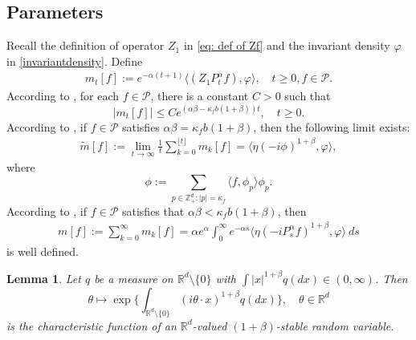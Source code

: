 \documentclass[12pt,a4paper]{amsart}
\theoremstyle{plain}
\newtheorem{lem}[thm]{Lemma}
\theoremstyle{definition}
\numberwithin{equation}{section}
\begin{document}
\subsection{Parameters}
    Recall the definition of operator $Z_1$ in \eqref{eq: def of Zf} and the invariant density $\varphi$ in \eqref{invariantdensity}.
    Define
 \begin{equation}\begin{split}
 \label{parameter_mk}
      m_t[f]
      :=e^{-\alpha (t+1)} \langle (Z_1P^\alpha_t f), \varphi\rangle,\quad t\geq 0, f\in \mathcal P.
 \end{split}\end{equation}
    According to \cite[Lemma 2.7]{MM}, for each $f\in\mathcal{P}$, there is a constant $C>0$ such that
\[
    |m_t[f]|
    \leq C e^{(\alpha\beta-\kappa_fb(1+\beta))t},
    \quad t\geq 0.
\]
    According to \cite[Lemma 4.2]{MM}, if $f \in \mathcal{P}$ satisfies $\alpha\beta=\kappa_f b(1+\beta)$, then the following limit exists:
\begin{equation}\begin{split}
\label{para: critical case}
    \tilde{m}[f]:=\lim_{t\rightarrow \infty}\frac{1}{t}\sum_{k=0}^{\lfloor t \rfloor}m_k[f]=\langle\eta(-i\phi)^{1+\beta},\varphi\rangle,
\end{split}\end{equation}
    where
\[
    \phi
    :=\sum_{p\in \mathbb Z_+^d:|p|=\kappa_f}\langle f, \phi_p\rangle\phi_p.
\]
    According to \cite[Lemma 5.1]{MM}, if $f\in \mathcal{P}$ satisfies that $\alpha\beta<\kappa_fb(1+\beta)$, then
\begin{equation}\begin{split}
    m[f]
    :=\sum_{k=0}^\infty m_k[f]
    =\alpha e^{\alpha}\int_0^{\infty} e^{-\alpha s} \langle \eta (-iP_s^\alpha f)^{1+\beta}, \varphi \rangle~ds \label{msmallcase}
\end{split}\end{equation}
is well defined.
\begin{lem}
\label{lem: charactreisticfunction}
    Let $q$ be a measure on $\mathbb R^d\setminus\{0\}$ with $\int |x|^{1+\beta} q(dx) \in (0,\infty)$.
    Then $$\theta \mapsto  \exp\Big\{\int_{\mathbb R^d\setminus\{0\}} (i\theta \cdot x)^{1+\beta} q(dx)\Big\},\quad \theta \in \mathbb R^d$$
    is the characteristic function of an $\mathbb R^d$-valued $(1+\beta)$-stable random variable.
\end{lem}
\end{document}
